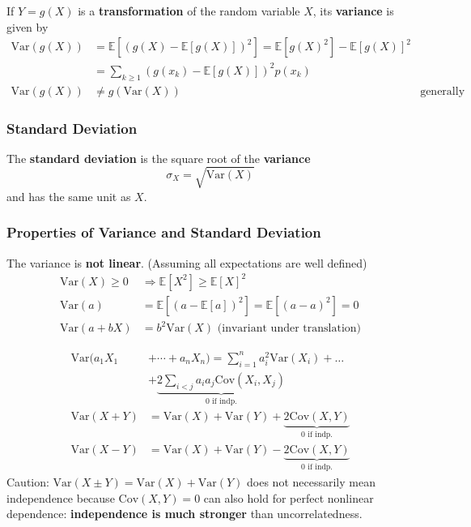 \newpar{}
If $Y=g(X)$ is a \textbf{transformation} of the random variable $X$, its \textbf{variance} is given by
\noindent\begin{align*}
    \mathrm{Var}(g(X)) & =\mathbb{E}[{(g(X)-\mathbb{E}[g(X)])}^{2}]   = \mathbb{E}[{g(X)}^2]-{\mathbb{E}[g(X)]}^2                    \\      
                       & =\sum_{k\geq1}{(g(x_{k})-\mathbb{E}[g(X)])}^{2}p(x_{k})                                                     \\
    \mathrm{Var}(g(X)) & \neq g(\mathrm{Var}(X))                                                                  & \text{generally}
\end{align*}

\subsubsection{Standard Deviation}
The \textbf{standard deviation} is the square root of the \textbf{variance}
\noindent\begin{equation*}
    \sigma_{X}=\sqrt{\mathrm{Var}(X)}
\end{equation*}
and has the same unit as $X$.

\subsubsection{Properties of Variance and Standard Deviation}

The variance is \textbf{not linear}. (Assuming all expectations are well defined)
\noindent\begin{align*}
    \mathrm{Var}(X)\geq0 & \Rightarrow\mathbb{E}[X^{2}]\geq{\mathbb{E}[X]}^{2}        \\
    \mathrm{Var}(a)      & =\mathbb{E}[{(a-\mathbb{E}[a])}^2]=\mathbb{E}[{(a-a)}^2]=0 \\
    \mathrm{Var}(a+bX)   & = b^2\mathrm{Var}(X)\text{ (invariant under translation)}
\end{align*}

\noindent\begin{align*}
    \mathrm{Var}(a_1X_1 & +\cdots+a_n X_n)  =\sum_{i=1}^{n}a_{i}^{2}\mathrm{Var}(X_{i})+\ldots                  \\
                        & + \underbrace{2\sum_{i<j}a_{i}a_{j}\mathrm{Cov}(X_{i},X_{j})}_{0\text{ if indp.}}     \\
    \mathrm{Var}(X+Y)   & =\mathrm{Var}(X)+\mathrm{Var}(Y)+ \underbrace{2\mathrm{Cov}(X,Y)}_{0\text{ if indp.}} \\
    \mathrm{Var}(X-Y)   & =\mathrm{Var}(X)+\mathrm{Var}(Y)-\underbrace{2\mathrm{Cov}(X,Y)}_{0\text{ if indp.}}
\end{align*}
Caution: $\mathrm{Var}(X\pm Y) = \mathrm{Var}(X)+\mathrm{Var}(Y)$ does not necessarily mean independence because $\mathrm{Cov}(X,Y)=0$ can also hold for perfect nonlinear dependence: \textbf{independence is much stronger} than uncorrelatedness.

